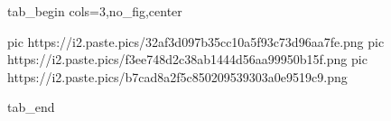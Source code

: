  
 
 
 
 


\ifcmt
  tab_begin cols=3,no_fig,center

     pic https://i2.paste.pics/32af3d097b35cc10a5f93c73d96aa7fe.png
		 pic https://i2.paste.pics/f3ee748d2c38ab1444d56aa99950b15f.png
		 pic https://i2.paste.pics/b7cad8a2f5c850209539303a0e9519c9.png

  tab_end
\fi
